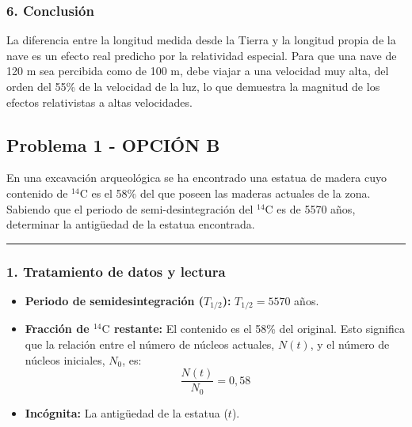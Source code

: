 \subsubsection*{6. Conclusión}
\begin{cajaconclusion}
La diferencia entre la longitud medida desde la Tierra y la longitud propia de la nave es un efecto real predicho por la relatividad especial. Para que una nave de 120 m sea percibida como de 100 m, debe viajar a una velocidad muy alta, del orden del 55\% de la velocidad de la luz, lo que demuestra la magnitud de los efectos relativistas a altas velocidades.
\end{cajaconclusion}

\newpage

\subsection{Problema 1 - OPCIÓN B}
\label{subsec:6B_2001_jun_ord}

\begin{cajaenunciado}
En una excavación arqueológica se ha encontrado una estatua de madera cuyo contenido de $^{14}\text{C}$ es el 58\% del que poseen las maderas actuales de la zona. Sabiendo que el periodo de semi-desintegración del $^{14}\text{C}$ es de 5570 años, determinar la antigüedad de la estatua encontrada.
\end{cajaenunciado}
\hrule

\subsubsection*{1. Tratamiento de datos y lectura}
\begin{itemize}
    \item \textbf{Periodo de semidesintegración ($T_{1/2}$):} $T_{1/2} = 5570$ años.
    \item \textbf{Fracción de $^{14}\text{C}$ restante:} El contenido es el 58\% del original. Esto significa que la relación entre el número de núcleos actuales, $N(t)$, y el número de núcleos iniciales, $N_0$, es:
    $$ \frac{N(t)}{N_0} = 0,58 $$
    \item \textbf{Incógnita:} La antigüedad de la estatua ($t$).
\end{itemize}

